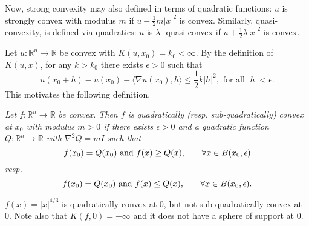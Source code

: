 \documentclass[10pt]{article}
\newenvironment{definition}[2][Definition]{\begin{trivlist}
\item[\hskip \labelsep {\bfseries #1}\hskip \labelsep {\bfseries #2.}]}{\end{trivlist}}
\newenvironment{example}[2][Example]{\begin{trivlist}
\item[\hskip \labelsep {\bfseries #1}\hskip \labelsep {\bfseries #2.}]}{\end{trivlist}}
\begin{document}
Now, strong convexity may also defined in terms of quadratic functions: $u$ is strongly convex with modulus $m$ if $u-\frac{1}{2}m|x|^2$ is convex. Similarly, quasi-convexity, is defined via quadratics: $u$ is $\lambda$- quasi-convex if $u+ \frac{1}{2}\lambda |x|^2$ is convex.

Let $u:\mathbb{R}^n \rightarrow \mathbb{R}$ be convex with $K(u,x_0)=k_0 <\infty$. By the definition of $K(u,x)$, for any $k>k_0$ there exists $\epsilon >0$ such that
$$u(x_0+h)-u(x_0)-\langle \nabla u(x_0), h \rangle \leq \frac{1}{2} k|h|^2, \text{ for all } |h|< \epsilon .$$
This motivates the following definition.
\begin{definition}{3.4}
\textit{Let $f:\mathbb{R}^n \rightarrow \mathbb{R}$ be convex. Then $f$ is quadratically (resp. sub-quadratically) convex at $x_0$ with modulus $m>0$ if there exists $\epsilon >0$ and a quadratic function $Q:\mathbb{R}^n\rightarrow \mathbb{R}$ with $\nabla^2 Q=mI$ such that 
$$f(x_0)=Q(x_0) \text{ and } f(x) \geq Q(x),\hspace{6.6mm} \forall x\in B(x_0,\epsilon)$$ resp. 
$$f(x_0)=Q(x_0) \text{ and } f(x) \leq Q(x),\hspace{6.6mm} \forall x\in B(x_0,\epsilon).$$ }
\end{definition}

\begin{example}{3.5}
$f(x)=|x|^{4/3}$ is quadratically convex at 0, but not sub-quadratically convex at 0. Note also that $K(f,0)=+\infty$ and it does not have a sphere of support at 0.
\end{example}
\end{document}
